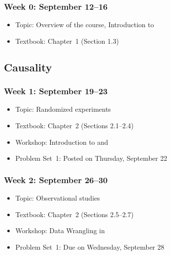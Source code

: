 \documentclass[11pt]{article}
\begin{document}
\subsubsection*{\sc Week 0: September 12--16}

\begin{itemize}
\item {\sc Topic}: Overview of the course, Introduction to \R

\item {\sc Textbook}: Chapter~1 (Section 1.3)

\end{itemize}

\subsection*{Causality}

\subsubsection*{\sc Week 1: September 19--23}

\begin{itemize}

\item {\sc Topic}: Randomized experiments

\item {\sc Textbook}: Chapter~2 (Sections 2.1--2.4) 

\item {\sc Workshop}: Introduction to \R{} and \Rst

\item {\sc Problem Set~1}: Posted on Thursday, September 22 

\end{itemize}


\subsubsection*{\sc Week 2: September 26--30}

\begin{itemize}

\item {\sc Topic}: Observational studies

\item {\sc Textbook}: Chapter~2 (Sections 2.5--2.7) 

\item {\sc Workshop}: Data Wrangling in \R

\item {\sc Problem Set~1}: Due on Wednesday, September 28

\end{itemize}
\end{document}
